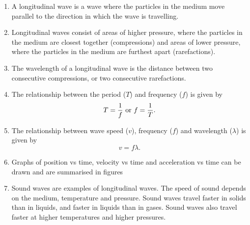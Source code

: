 \begin{enumerate}
\item A longitudinal wave is a wave where the particles in the medium move parallel to the direction in which the wave is travelling.

\item Longitudinal waves consist of areas of higher pressure, where the particles in the medium are closest together (compressions) and areas of lower pressure, where the particles in the medium are furthest apart (rarefactions).

\item The wavelength of a longitudinal wave is the distance between two consecutive compressions, or two consecutive rarefactions.

\item The relationship between the period ($T$) and frequency ($f$) is given by
$$T = \frac{1}{f} \textnormal{ or } f = \frac{1}{T}.$$

\item The relationship between wave speed ($v$), frequency ($f$) and wavelength ($\lambda$) is given by
$$v = f \lambda.$$

\item Graphs of position vs time, velocity vs time and acceleration vs time can be drawn and are summarised in figures %

\item Sound waves are examples of longitudinal waves. The speed of sound depends on the medium, temperature and pressure. Sound waves travel faster in solids than in liquids, and faster in liquids than in gases. Sound waves also travel faster at higher temperatures and higher pressures.
\end{enumerate}

